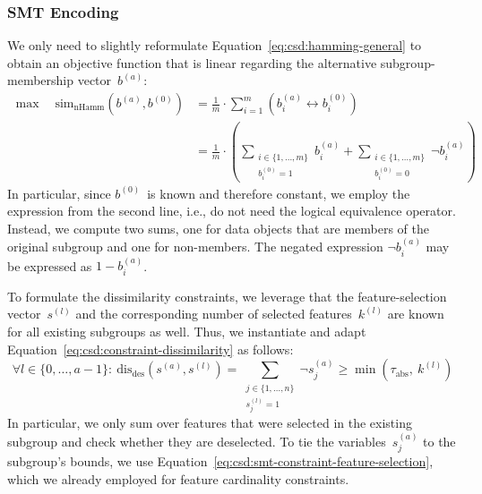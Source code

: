 \documentclass{article}
\theoremstyle{definition}
\begin{document}
\subsubsection{SMT Encoding}
\label{sec:csd:approach:alternatives:smt}

We only need to slightly reformulate Equation~\ref{eq:csd:hamming-general} to obtain an objective function that is linear regarding the alternative subgroup-membership vector~$b^{(a)}$:
%
\begin{equation}
	\begin{aligned}
		\max \quad \text{sim}_{\text{nHamm}}(b^{(a)}, b^{(0)}) &= \frac{1}{m} \cdot \sum_{i=1}^m \left( b_i^{(a)} \leftrightarrow b_i^{(0)} \right) \\
		&= \frac{1}{m} \cdot \left( \sum\limits_{\substack{i \in \{1, \dots, m\} \\ b_i^{(0)} = 1}} b_i^{(a)} + \sum\limits_{\substack{i \in \{1, \dots, m\} \\ b_i^{(0)} = 0}} \lnot b_i^{(a)} \right)
	\end{aligned}
	\label{eq:csd:smt-hamming}
\end{equation}
%
In particular, since $b^{(0)}$~is known and therefore constant, we employ the expression from the second line, i.e., do not need the logical equivalence operator.
Instead, we compute two sums, one for data objects that are members of the original subgroup and one for non-members.
The negated expression $\lnot b_i^{(a)}$ may be expressed as $1 - b_i^{(a)}$.

To formulate the dissimilarity constraints, we leverage that the feature-selection vector~$s^{(l)}$ and the corresponding number of selected features~$k^{(l)}$ are known for all existing subgroups as well.
Thus, we instantiate and adapt Equation~\ref{eq:csd:constraint-dissimilarity} as follows:
%
\begin{equation}
	\forall l \in \{0, \dots, a-1\}:~ \text{dis}_{\text{des}}(s^{(a)}, s^{(l)}) = \sum_{\substack{j \in \{1, \dots, n\} \\ s^{(l)}_j = 1}} \lnot s^{(a)}_j \geq \min \left( \tau_{\text{abs}},~k^{(l)} \right)
	\label{eq:csd:smt-constraint-dissimilarity}
\end{equation}
%
In particular, we only sum over features that were selected in the existing subgroup and check whether they are deselected.
To tie the variables~$s^{(a)}_j$ to the subgroup's bounds, we use Equation~\ref{eq:csd:smt-constraint-feature-selection}, which we already employed for feature cardinality constraints.
\end{document}
